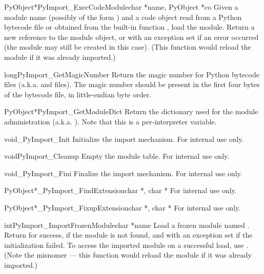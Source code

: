 \documentclass{manual}
\begin{document}
\begin{cfuncdesc}{PyObject*}{PyImport_ExecCodeModule}{char *name, PyObject *co}
Given a module name (possibly of the form ) and a
code object read from a Python bytecode file or obtained from the
built-in function , load the
module.  Return a new reference to the module object, or \NULL{} with
an exception set if an error occurred (the module may still be created
in this case).  (This function would reload the module if it was
already imported.)
\end{cfuncdesc}

\begin{cfuncdesc}{long}{PyImport_GetMagicNumber}{}
Return the magic number for Python bytecode files (a.k.a.
 and  files).  The magic number should be
present in the first four bytes of the bytecode file, in little-endian
byte order.
\end{cfuncdesc}

\begin{cfuncdesc}{PyObject*}{PyImport_GetModuleDict}{}
Return the dictionary used for the module administration
(a.k.a. ).  Note that this is a per-interpreter
variable.
\end{cfuncdesc}

\begin{cfuncdesc}{void}{_PyImport_Init}{}
Initialize the import mechanism.  For internal use only.
\end{cfuncdesc}

\begin{cfuncdesc}{void}{PyImport_Cleanup}{}
Empty the module table.  For internal use only.
\end{cfuncdesc}

\begin{cfuncdesc}{void}{_PyImport_Fini}{}
Finalize the import mechanism.  For internal use only.
\end{cfuncdesc}

\begin{cfuncdesc}{PyObject*}{_PyImport_FindExtension}{char *, char *}
For internal use only.
\end{cfuncdesc}

\begin{cfuncdesc}{PyObject*}{_PyImport_FixupExtension}{char *, char *}
For internal use only.
\end{cfuncdesc}

\begin{cfuncdesc}{int}{PyImport_ImportFrozenModule}{char *name}
Load a frozen module named .  Return  for success,
 if the module is not found, and  with an exception
set if the initialization failed.  To access the imported module on a
successful load, use .
(Note the misnomer --- this function would reload the module if it was
already imported.)
\end{cfuncdesc}
\end{document}
